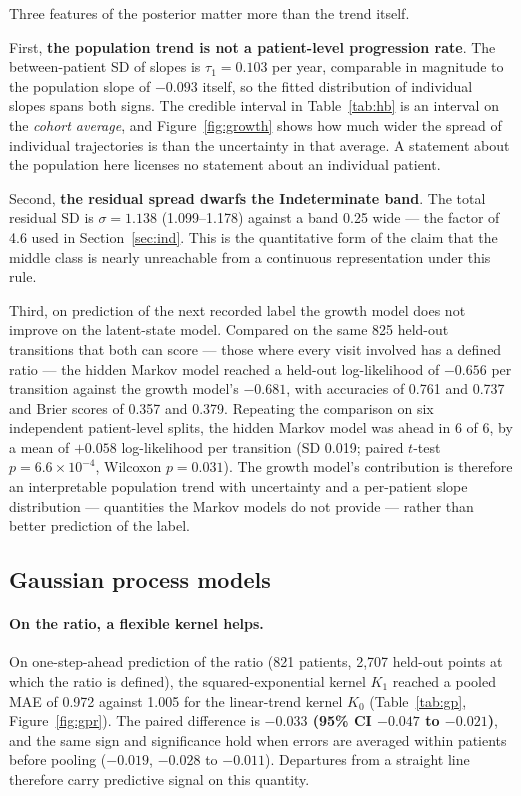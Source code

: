 \documentclass[11pt]{article}
\begin{document}
Three features of the posterior matter more than the trend itself.

First, \textbf{the population trend is not a patient-level progression rate}.
The between-patient SD of slopes is $\tau_1 = 0.103$ per year, comparable in
magnitude to the population slope of $-0.093$ itself, so the fitted distribution
of individual slopes spans both signs. The credible interval in
Table~\ref{tab:hb} is an interval on the \emph{cohort average}, and
Figure~\ref{fig:growth} shows how much wider the spread of individual
trajectories is than the uncertainty in that average. A statement about the
population here licenses no statement about an individual patient.

Second, \textbf{the residual spread dwarfs the Indeterminate band}. The total
residual SD is $\sigma = 1.138$ (1.099--1.178) against a band 0.25 wide --- the
factor of 4.6 used in Section~\ref{sec:ind}. This is the quantitative form of
the claim that the middle class is nearly unreachable from a continuous
representation under this rule.

Third, on prediction of the next recorded label the growth model does not
improve on the latent-state model. Compared on the same 825 held-out transitions
that both can score --- those where every visit involved has a defined ratio ---
the hidden Markov model reached a held-out log-likelihood of $-0.656$ per
transition against the growth model's $-0.681$, with accuracies of 0.761 and
0.737 and Brier scores of 0.357 and 0.379. Repeating the comparison on six
independent patient-level splits, the hidden Markov model was ahead in 6 of 6,
by a mean of $+0.058$ log-likelihood per transition (SD 0.019; paired
$t$-test $p = 6.6 \times 10^{-4}$, Wilcoxon $p = 0.031$). The growth model's
contribution is therefore an interpretable population trend with uncertainty and
a per-patient slope distribution --- quantities the Markov models do not provide
--- rather than better prediction of the label.

\subsection{Gaussian process models}
\label{sec:gpres}

\paragraph{On the ratio, a flexible kernel helps.}
On one-step-ahead prediction of the ratio (821 patients, 2,707 held-out points
at which the ratio is defined), the squared-exponential kernel $K_1$ reached a
pooled MAE of 0.972 against 1.005 for the linear-trend kernel $K_0$
(Table~\ref{tab:gp}, Figure~\ref{fig:gpr}). The paired difference is
\textbf{$-0.033$ (95\% CI $-0.047$ to $-0.021$)}, and the same sign and
significance hold when errors are averaged within patients before pooling
($-0.019$, $-0.028$ to $-0.011$). Departures from a straight line therefore
carry predictive signal on this quantity.
\end{document}
